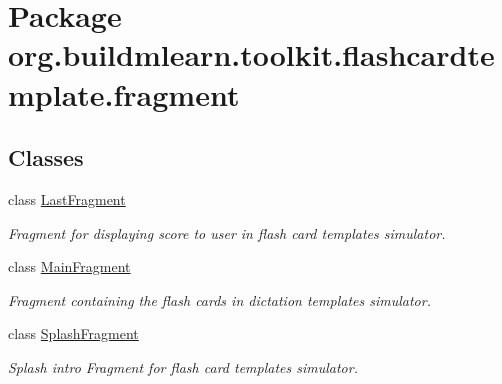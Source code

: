 \hypertarget{namespaceorg_1_1buildmlearn_1_1toolkit_1_1flashcardtemplate_1_1fragment}{}\section{Package org.\+buildmlearn.\+toolkit.\+flashcardtemplate.\+fragment}
\label{namespaceorg_1_1buildmlearn_1_1toolkit_1_1flashcardtemplate_1_1fragment}
\subsection*{Classes}
\begin{DoxyCompactItemize}
\item 
class \hyperlink{classorg_1_1buildmlearn_1_1toolkit_1_1flashcardtemplate_1_1fragment_1_1LastFragment}{Last\+Fragment}
\begin{DoxyCompactList}\small\item\em Fragment for displaying score to user in flash card template\textquotesingle{}s simulator. \end{DoxyCompactList}\item 
class \hyperlink{classorg_1_1buildmlearn_1_1toolkit_1_1flashcardtemplate_1_1fragment_1_1MainFragment}{Main\+Fragment}
\begin{DoxyCompactList}\small\item\em Fragment containing the flash cards in dictation template\textquotesingle{}s simulator. \end{DoxyCompactList}\item 
class \hyperlink{classorg_1_1buildmlearn_1_1toolkit_1_1flashcardtemplate_1_1fragment_1_1SplashFragment}{Splash\+Fragment}
\begin{DoxyCompactList}\small\item\em Splash intro Fragment for flash card template\textquotesingle{}s simulator. \end{DoxyCompactList}\end{DoxyCompactItemize}

